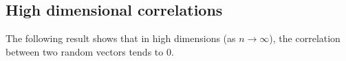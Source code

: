 \subsection{High dimensional correlations}
The following result shows that in high dimensions (as \(n \to \infty\)), the correlation between two random vectors tends to 0.
%
